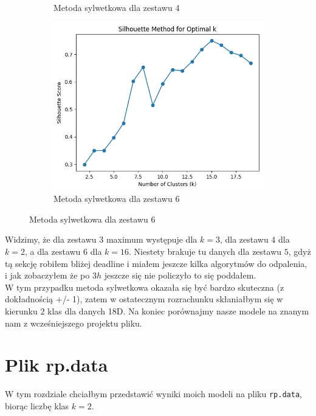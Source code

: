 \documentclass[polish,12pt,a4paper]{extarticle}
\begin{document}
\begin{figure}[h!]
\begin{subfigure}[b]{0.30\textwidth}
        \captionsetup{labelformat=empty}
        \centering
        \centering\caption{Metoda sylwetkowa dla zestawu 4}
    \end{subfigure}
    \hspace{}
    \begin{subfigure}[b]{0.30\textwidth}
        \includegraphics[width=\linewidth]{img/silhouette6.png}
        \captionsetup{labelformat=empty}
        \centering
        \centering\caption{Metoda sylwetkowa dla zestawu 6}
    \end{subfigure}

    \label{fig:data_grid}
\end{figure} \FloatBarrier

\noindent Widzimy, że dla zestawu 3 maximum występuje dla $k = 3$, dla zestawu 4 dla $k = 2$, a dla zestawu 6 dla $k = 16$. Niestety brakuje tu danych dla zestawu $5$, gdyż tą sekcję robiłem bliżej deadline i miałem jeszcze kilka algorytmów do odpalenia, i jak zobaczyłem że po $3h$ jeszcze się nie policzyło to się poddałem. \smallskip \\
W tym przypadku metoda sylwetkowa okazała się być bardzo skuteczna (z dokładnością +/- 1), zatem w ostatecznym rozrachunku skłaniałbym się w kierunku $2$ klas dla danych 18D. Na koniec porównajmy nasze modele na znanym nam z wcześniejszego projektu pliku.


\section{Plik rp.data}
W tym rozdziale chciałbym przedstawić wyniki moich modeli na pliku \texttt{rp.data}, biorąc liczbę klas $k = 2$.
\end{document}
